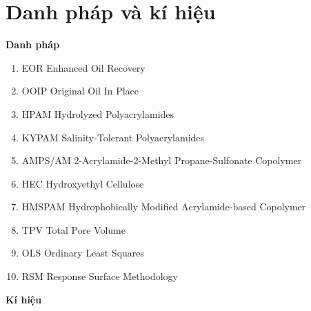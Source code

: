 \documentclass[12pt,a4paper]{article}
\begin{document}
\section*{\textbf{Danh pháp và kí hiệu}}
\hspace*{1cm}\textbf{Danh pháp}
	\begin{enumerate}
		\item[] EOR \hspace*{50pt} Enhanced Oil Recovery
		\item[] OOIP \hspace*{45pt} Original Oil In Place
		\item[] HPAM \hspace*{39pt} Hydrolyzed Polyacrylamides
		\item[] KYPAM \hspace*{29pt} Salinity-Tolerant Polyacrylamides
		\item[] AMPS/AM \hspace*{15pt} 2-Acrylamide-2-Methyl Propane-Sulfonate Copolymer
		\item[] HEC \hspace*{47pt} Hydroxyethyl Cellulose
		\item[] HMSPAM \hspace*{19pt} Hydrophobically Modified Acrylamide-based Copolymer
		\item[] TPV \hspace*{47pt} Total Pore Volume
		\item[] OLS \hspace*{47pt} Ordinary Least Squares
		\item[] RSM \hspace*{44pt} Response Surface Methodology
	\end{enumerate}
	\newpage
	\noindent
\hspace*{1cm}\textbf{Kí hiệu}
\end{document}
